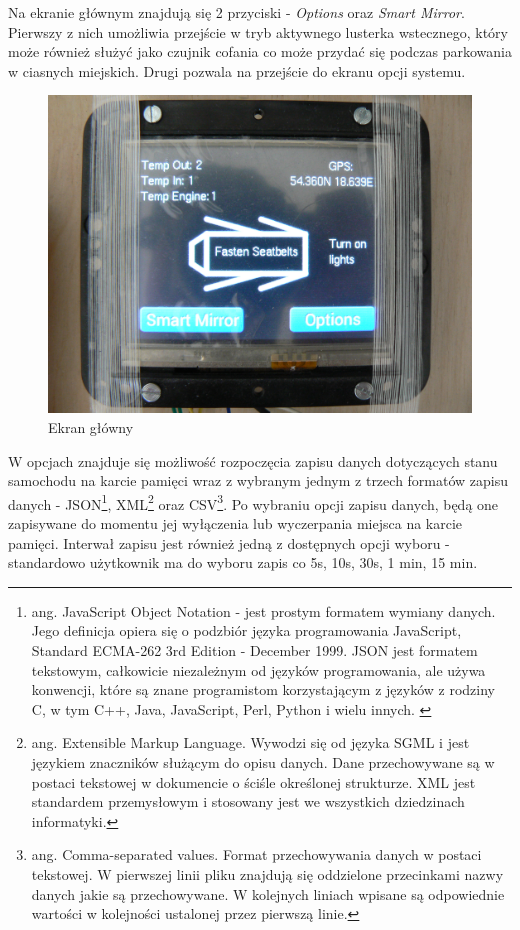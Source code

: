 \documentclass{xmgr}
\begin{document}
Na ekranie głównym znajdują się 2 przyciski - \emph{Options} oraz \emph{Smart Mirror}. Pierwszy z nich umożliwia przejście w tryb aktywnego lusterka wstecznego, który może również służyć jako czujnik cofania co może przydać się podczas parkowania w ciasnych miejskich. Drugi pozwala na przejście do ekranu opcji systemu. 

\begin{figure}[!h]
    \centering
    	\includegraphics[height=0.3\textheight]{images/mainScreen.JPG}
    \caption{Ekran główny}
\end{figure}

W opcjach znajduje się możliwość rozpoczęcia zapisu danych dotyczących stanu samochodu na karcie pamięci wraz z wybranym jednym z trzech formatów zapisu danych - JSON\footnote{ang. JavaScript Object Notation - jest prostym formatem wymiany danych. Jego definicja opiera się o podzbiór języka programowania JavaScript, Standard ECMA-262 3rd Edition - December 1999. JSON jest formatem tekstowym, całkowicie niezależnym od języków programowania, ale używa konwencji, które są znane programistom korzystającym z języków z rodziny C, w tym C++, Java, JavaScript, Perl, Python i wielu innych. \cite{JSON}}, XML\footnote{ang. Extensible Markup Language. Wywodzi się od języka SGML i jest językiem znaczników służącym do opisu danych. Dane przechowywane są w postaci tekstowej w dokumencie o ściśle określonej strukturze. XML jest standardem przemysłowym i stosowany jest we wszystkich dziedzinach informatyki.\cite{XML}} oraz CSV\footnote{ang. Comma-separated values. Format przechowywania danych w postaci tekstowej. W pierwszej linii pliku znajdują się oddzielone przecinkami nazwy danych jakie są przechowywane. W kolejnych liniach wpisane są odpowiednie wartości w kolejności ustalonej przez pierwszą linie.}. Po wybraniu opcji zapisu danych, będą one zapisywane do momentu jej wyłączenia lub wyczerpania miejsca na karcie pamięci. Interwał zapisu jest również jedną z dostępnych opcji wyboru - standardowo użytkownik ma do wyboru zapis co 5s, 10s, 30s, 1 min, 15 min.
\end{document}
